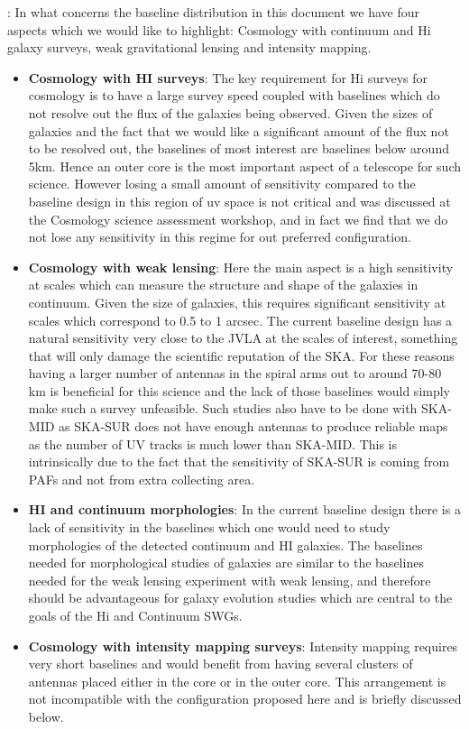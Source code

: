 \documentclass[sfheadings,a4paper,times,9pt,floats,floatfix]{article}
\begin{document}
\smallskip
{}: In what concerns the baseline distribution in this document we have four
aspects which we would like to highlight: Cosmology with continuum and
H{\sc i} galaxy surveys, weak
gravitational lensing and intensity mapping.\\
\begin{itemize}
\item {\bf Cosmology with HI surveys}: The key requirement for H{\sc i}
surveys for cosmology is to have a large
survey speed coupled with baselines which do not resolve out the flux of the galaxies being
observed. Given the sizes of galaxies and the fact that we would like a significant amount of
the flux not to be resolved out, the baselines of most interest are baselines below around
5km. Hence an outer core is the most important aspect of a telescope for such science.
However losing a small amount of sensitivity compared to the baseline design in this region
of uv space is not critical and was discussed at the Cosmology science
assessment workshop, and in fact we find that we do not lose any
sensitivity in this regime for out preferred configuration. 

\item {\bf Cosmology with weak lensing}: Here the main aspect is a high sensitivity at scales which can
measure the structure and shape of the galaxies in continuum. Given the size of galaxies,
this requires significant sensitivity at scales which correspond to
0.5 to 1 arcsec. The current baseline design has a natural sensitivity
very close to the JVLA at the scales of interest, something that will
only damage the scientific reputation of the SKA. 
For these reasons having a larger number of antennas in the spiral arms out to around 70-80
km is beneficial for this science and the lack of those baselines would simply make such a
survey unfeasible. Such studies also have to be done with SKA-MID as SKA-SUR does not have
enough antennas to produce reliable maps as the number of UV tracks is much lower than
SKA-MID. This is intrinsically due to the fact that the sensitivity of SKA-SUR is coming from
PAFs and not from extra collecting area.

\item {\bf HI and continuum morphologies}: In the current baseline design there is a lack of sensitivity
in the baselines which one would need to study morphologies of the detected continuum
and HI galaxies. The baselines needed for morphological studies of galaxies
are similar to the baselines needed for the weak lensing experiment
with weak lensing, and therefore should be advantageous for galaxy
evolution studies which are central to the goals of the H{\sc i} and
Continuum SWGs.

\item {\bf Cosmology with intensity mapping surveys}: Intensity mapping requires very short baselines
and would benefit from having several clusters of antennas placed either in the core or in
the outer core. This arrangement is not incompatible with the configuration
proposed here and is briefly discussed below.
\end{itemize}
\end{document}
